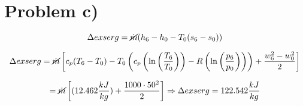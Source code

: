 \section*{Problem c)}

\[
\Delta exserg = \cancel{\dot{m}} (h_6 - h_0 - T_0 (s_6 - s_0))
\]

\[
\Delta exserg = \cancel{\dot{m}} \left[ c_p (T_6 - T_0) - T_0 \left( c_p \left( \ln \left( \frac{T_6}{T_0} \right) \right) - R \left( \ln \left( \frac{p_6}{p_0} \right) \right) \right) + \frac{w_6^2 - w_0^2}{2} \right]
\]

\[
= \cancel{\dot{m}} \left[ (12.462 \frac{kJ}{kg}) + \frac{1000 \cdot 50^2}{2} \right] \Rightarrow \Delta exserg = 122.542 \frac{kJ}{kg}
\]